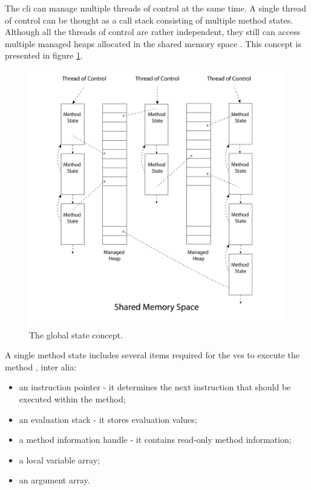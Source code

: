 \documentclass{article}
\numberwithin{equation}{section}
\begin{document}
The \acrshort{cli} can manage multiple threads of control at the same time. A single thread of control can be thought as a call stack consisting of multiple method states. Although all the threads of control are rather independent, they still can access multiple managed heaps allocated in the shared memory space \cite{ecmaStandard}. This concept is presented in figure \ref{fig:global_state}.

\begin{figure}
	\includegraphics[width=1\textwidth]{global_state.png}
    \centering
    \caption{The global state concept.}
    \label{fig:global_state}
\end{figure}

A single method state includes several items required for the \acrshort{ves} to execute the method \cite{ecmaStandard}, inter alia:
\begin{itemize}
	\item{an instruction pointer - it determines the next instruction that should be executed within the method;}
	\item{an evaluation stack - it stores evaluation values;}
	\item{a method information handle - it contains read-only method information;}
	\item{a local variable array;}
	\item{an argument array.}
\end{itemize}
\end{document}

